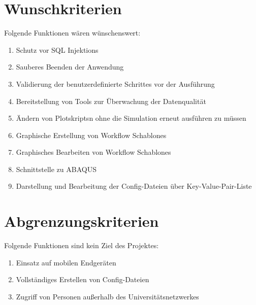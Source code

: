 \section{Wunschkriterien}
Folgende Funktionen wären wünschenswert:
\renewcommand{\labelenumi}{/W\arabic{enumi}0/}
\begin{enumerate}
    \setlength\itemsep{-1em}
    \item Schutz vor \gls{SQL} \glspl{Injektion}
    \item Sauberes Beenden der Anwendung
    \item Validierung der \glspl{benutzerdefinierte Schritte} vor der Ausführung
    \item Bereitstellung von Tools zur Überwachung der Datenqualität
    \item Ändern von \glspl{Plotskript}n ohne die Simulation erneut ausführen zu müssen
    \item Graphische Erstellung von \glspl{Workflow Schablone}
    \item Graphisches Bearbeiten von \glspl{Workflow Schablone}
    \item Schnittstelle zu \gls{ABAQUS}
    \item Darstellung und Bearbeitung der Config-Dateien über \gls{Key-Value-Pair}-Liste
\end{enumerate}

\section{Abgrenzungskriterien}
Folgende Funktionen sind kein Ziel des Projektes:
\renewcommand{\labelenumi}{/A\arabic{enumi}0/}
\begin{enumerate}
    \setlength\itemsep{-1em}
    \item Einsatz auf mobilen Endgeräten
    \item Vollständiges Erstellen von Config-Dateien
    \item Zugriff von Personen außerhalb des Universitätsnetzwerkes 
\end{enumerate}
\renewcommand{\labelenumi}{\arabic{enumi}}
